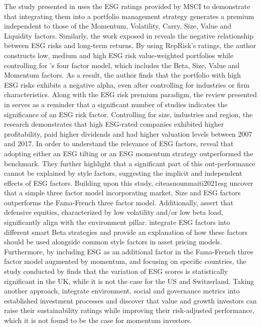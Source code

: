 \documentclass[11pt,a4paper]{article}
\begin{document}
The study presented in  uses the ESG ratings provided by MSCI to demonstrate that integrating them into a portfolio management strategy generates a premium independent to those of the Momentum, Volatility, Carry, Size, Value and Liquidity factors. 
Similarly, the work exposed in  reveals the negative relationship between ESG risks and long-term returns. By using RepRisk's ratings, the author constructs low, medium and high ESG risk value-weighted portfolios while controlling for 's four factor model, which includes the Beta, Size, Value and Momentum factors. 
As a result, the author finds that the portfolio with high ESG risks exhibits a negative alpha, even after controlling for industries or firm characteristics. Along with the ESG risk premium paradigm, the review presented in  serves as a reminder that a significant number of studies indicates the significance of an ESG risk factor.
Controlling for size, industries and region, the research  demonstrates that high ESG-rated companies exhibited higher profitability, paid higher dividends and had higher valuation levels between 2007 and 2017. 
In order to understand the relevance of ESG factors,  reveal that adopting either an ESG tilting or an ESG momentum strategy outperformed the benchmark. They further highlight that a significant part of this out-performance cannot be explained by style factors, suggesting the implicit and independent effects of ESG factors. 
Building upon this study, citeasnoun{maiti2021esg} uncover that a simple three factor model incorporating market, Size and ESG factors outperforms the Fama-French three factor model.
Additionally,  assert that defensive equities, characterized by low volatility and/or low beta load, significantly align with the environment pillar. 
 integrate ESG factors into different smart Beta strategies and provide an explanation of how these factors should be used alongside common style factors in asset pricing models. 
Furthermore, by including ESG as an additional factor in the Fama-French three factor model augmented by momentum, and focusing on specific countries, the study conducted by  finds that the variation of ESG scores is statistically significant in the UK, while it is not the case for the US and Switzerland. 
Taking another approach,  integrate environment, social and governance metrics into established investment processes and discover that value and growth investors can raise their sustainability ratings while improving their risk-adjusted performance, which it is not found to be the case for momentum investors. 
\end{document}

